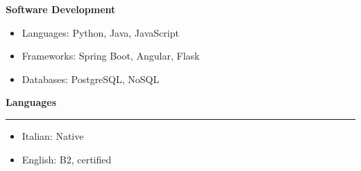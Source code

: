 \documentclass[9pt, a4paper]{article}
\newcommand{\cvsection}[1]{%
	\vspace{2pt}\par
	{\Large\bfseries\color{sectionblue}#1}\par
	\vspace{2pt}\hrule\vspace{6pt}
}
\begin{document}
\begin{minipage}[t]{0.27\linewidth}
		{\bfseries Software Development}
		\begin{itemize}[leftmargin=*, nosep, itemsep=2pt]
			\item Languages: Python, Java, JavaScript
			\item Frameworks: Spring Boot, Angular, Flask
			\item Databases: PostgreSQL, NoSQL
		\end{itemize}
		
		
		\cvsection{Languages}
		\begin{itemize}[leftmargin=*, nosep, itemsep=2pt]
			\item Italian: Native
			\item English: B2, certified
		\end{itemize}
		
	\end{minipage}
	
\end{document}
